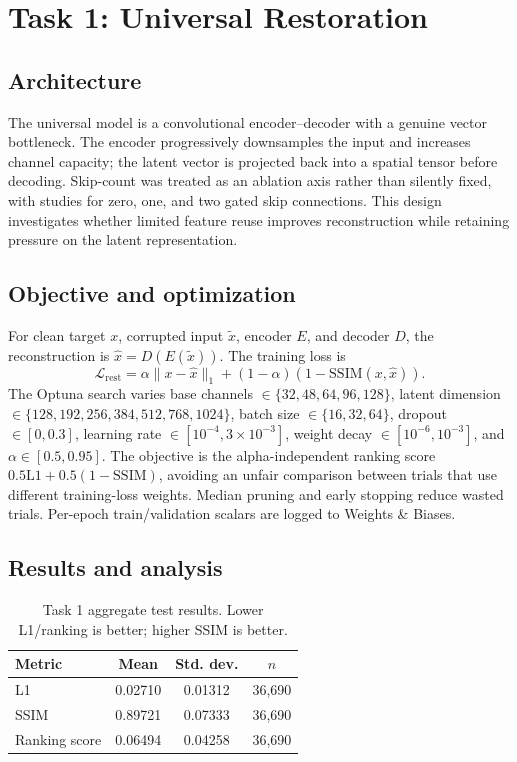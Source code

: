 \documentclass[conference]{IEEEtran}
\begin{document}
\section{Task 1: Universal Restoration}
\subsection{Architecture}
The universal model is a convolutional encoder--decoder with a genuine vector bottleneck. The encoder progressively downsamples the input and increases channel capacity; the latent vector is projected back into a spatial tensor before decoding. Skip-count was treated as an ablation axis rather than silently fixed, with studies for zero, one, and two gated skip connections. This design investigates whether limited feature reuse improves reconstruction while retaining pressure on the latent representation.

\subsection{Objective and optimization}
For clean target $x$, corrupted input $\tilde{x}$, encoder $E$, and decoder $D$, the reconstruction is $\hat{x}=D(E(\tilde{x}))$. The training loss is
\begin{equation}
\mathcal{L}_{\mathrm{rest}}=\alpha\|x-\hat{x}\|_1+(1-\alpha)(1-\mathrm{SSIM}(x,\hat{x})).
\end{equation}
The Optuna search varies base channels $\in\{32,48,64,96,128\}$, latent dimension $\in\{128,192,256,384,512,768,1024\}$, batch size $\in\{16,32,64\}$, dropout $\in[0,0.3]$, learning rate $\in[10^{-4},3\times10^{-3}]$, weight decay $\in[10^{-6},10^{-3}]$, and $\alpha\in[0.5,0.95]$. The objective is the alpha-independent ranking score $0.5\mathrm{L1}+0.5(1-\mathrm{SSIM})$, avoiding an unfair comparison between trials that use different training-loss weights. Median pruning and early stopping reduce wasted trials. Per-epoch train/validation scalars are logged to Weights \& Biases.

\subsection{Results and analysis}
\begin{table}[t]
\caption{Task 1 aggregate test results. Lower L1/ranking is better; higher SSIM is better.}
\label{tab:task1overall}
\centering
\begin{tabular}{lccc}
\toprule
Metric & Mean & Std. dev. & $n$\\
\midrule
L1 & 0.02710 & 0.01312 & 36,690\\
SSIM & 0.89721 & 0.07333 & 36,690\\
Ranking score & 0.06494 & 0.04258 & 36,690\\
\bottomrule
\end{tabular}
\end{table}
\end{document}
